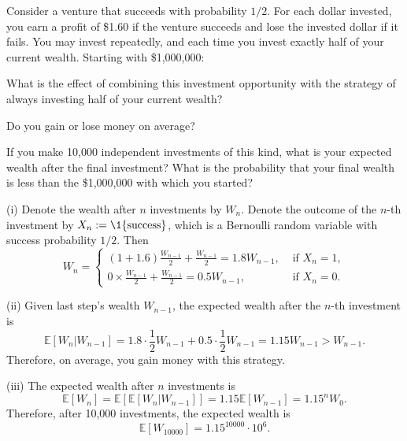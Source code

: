 \documentclass[11pt]{article}
\begin{document}
\makeassignmenttitle

\begin{problem}[20]
Consider a venture that succeeds with probability $1/2$. For each dollar invested,
you earn a profit of \$1.60 if the venture succeeds and lose the invested dollar if it fails.
You may invest repeatedly, and each time you invest exactly half of your current wealth.
Starting with \$1,000,000:

\begin{subproblems}
  \item {} What is the effect of combining this investment opportunity with the strategy
  of always investing half of your current wealth?

  \item {} Do you gain or lose money on average?

  \item {} If you make 10,000 independent investments of this kind, what is your
  expected wealth after the final investment? What is the probability that your final
  wealth is less than the \$1,000,000 with which you started?
\end{subproblems}

\begin{solution}

  (i) Denote the wealth after $n$ investments by $W_n$. Denote the outcome of the $n$-th investment by $X_n:=\1 \{\text{success}\}$, which is a Bernoulli random variable with success probability $1/2$. 
  Then
  \[
    W_n =  \begin{cases}
      (1+1.6) \frac{W_{n-1}}{2} + \frac{W_{n-1}}{2} = 1.8 W_{n-1}, & \text{ if } X_n=1,\\
      0 \times \frac{W_{n-1}}{2} + \frac{W_{n-1}}{2} = 0.5 W_{n-1}, & \text{ if } X_n=0.
    \end{cases}
  \]

  (ii) Given last step's wealth $W_{n-1}$, the expected wealth after the $n$-th investment is
  \[
    \mathbb{E}[W_n|W_{n-1}] = 1.8 \cdot \frac{1}{2} W_{n-1} + 0.5 \cdot \frac{1}{2} W_{n-1} = 1.15 W_{n-1} > W_{n-1}.
  \]
  Therefore, on average, you gain money with this strategy.

  (iii) The expected wealth after $n$ investments is
  \[
    \mathbb{E}[W_n] = \mathbb{E}[\mathbb{E}[W_n|W_{n-1}]] = 1.15 \mathbb{E}[W_{n-1}] = 1.15^n W_0.
  \]
  Therefore, after 10,000 investments, the expected wealth is
  \[
    \mathbb{E}[W_{10000}] = 1.15^{10000} \cdot 10^6.
  \]


\end{solution}
\end{problem}
\end{document}

